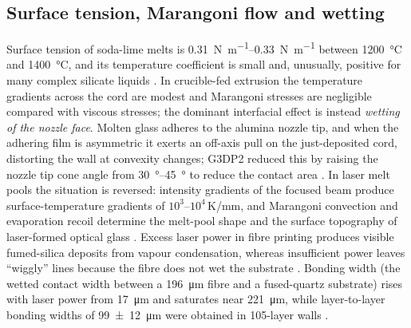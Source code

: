 \subsection{Surface tension, Marangoni flow and wetting}
Surface tension of soda-lime melts is \SIrange{0.31}{0.33}{\newton\per\metre} between \SI{1200}{\celsius} and \SI{1400}{\celsius}, and its temperature coefficient is small and, unusually, positive for many complex silicate liquids \citep{fluegel2007}. In crucible-fed extrusion the temperature gradients across the cord are modest and Marangoni stresses are negligible compared with viscous stresses; the dominant interfacial effect is instead \emph{wetting of the nozzle face}. Molten glass adheres to the alumina nozzle tip, and when the adhering film is asymmetric it exerts an off-axis pull on the just-deposited cord, distorting the wall at convexity changes; G3DP2 reduced this by raising the nozzle tip cone angle from \SIrange{30}{45}{\degree} to reduce the contact area \citep{inamura2018}. In laser melt pools the situation is reversed: intensity gradients of the focused beam produce surface-temperature gradients of \(10^{3}\)--\(10^{4}\)\,K/mm, and Marangoni convection and evaporation recoil determine the melt-pool shape and the surface topography of laser-formed optical glass \citep{machines2026meltpool}. Excess laser power in fibre printing produces visible fumed-silica deposits from vapour condensation, whereas insufficient power leaves ``wiggly'' lines because the fibre does not wet the substrate \citep{kth2022bonding}. Bonding width (the wetted contact width between a \SI{196}{\micro\metre} fibre and a fused-quartz substrate) rises with laser power from \SI{17}{\micro\metre} and saturates near \SI{221}{\micro\metre}, while layer-to-layer bonding widths of \SI{99 +- 12}{\micro\metre} were obtained in 105-layer walls \citep{kth2022bonding}.

